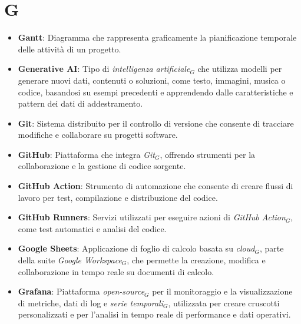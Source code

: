 \section{G}
\begin{itemize}
    \item \textbf{Gantt}: Diagramma che rappresenta graficamente la pianificazione temporale delle attività di un progetto.
    \item \textbf{Generative AI}: Tipo di \textit{intelligenza artificiale$_G$} che utilizza modelli per generare nuovi dati, contenuti o soluzioni, come testo, immagini, musica o codice, basandosi su esempi precedenti e apprendendo dalle caratteristiche e pattern dei dati di addestramento.
    \item \textbf{Git}: Sistema distribuito per il controllo di versione che consente di tracciare modifiche e collaborare su progetti software.
    \item \textbf{GitHub}: Piattaforma che integra \textit{Git}$_G$, offrendo strumenti per la collaborazione e la gestione di codice sorgente.
    \item \textbf{GitHub Action}: Strumento di automazione che consente di creare flussi di lavoro per test, compilazione e distribuzione del codice.
    \item \textbf{GitHub Runners}: Servizi utilizzati per eseguire azioni di \textit{GitHub Action}$_G$, come test automatici e analisi del codice.
    \item \textbf{Google Sheets}: Applicazione di foglio di calcolo basata su \textit{cloud}$_G$, parte della suite \textit{Google Workspace}$_G$, che permette la creazione, modifica e collaborazione in tempo reale su documenti di calcolo.
    \item \textbf{Grafana}: Piattaforma \textit{open-source}$_G$ per il monitoraggio e la visualizzazione di metriche, dati di log e \textit{serie temporali}$_G$, utilizzata per creare cruscotti personalizzati e per l'analisi in tempo reale di performance e dati operativi.
\end{itemize}
